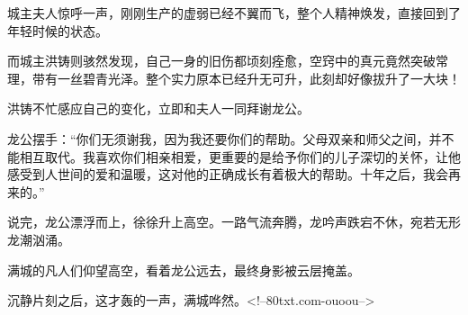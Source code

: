 \begin{this_body}
城主夫人惊呼一声，刚刚生产的虚弱已经不翼而飞，整个人精神焕发，直接回到了年轻时候的状态。

而城主洪铸则骇然发现，自己一身的旧伤都顷刻痊愈，空窍中的真元竟然突破常理，带有一丝碧青光泽。整个实力原本已经升无可升，此刻却好像拔升了一大块！

洪铸不忙感应自己的变化，立即和夫人一同拜谢龙公。

龙公摆手：“你们无须谢我，因为我还要你们的帮助。父母双亲和师父之间，并不能相互取代。我喜欢你们相亲相爱，更重要的是给予你们的儿子深切的关怀，让他感受到人世间的爱和温暖，这对他的正确成长有着极大的帮助。十年之后，我会再来的。”

说完，龙公漂浮而上，徐徐升上高空。一路气流奔腾，龙吟声跌宕不休，宛若无形龙潮汹涌。

满城的凡人们仰望高空，看着龙公远去，最终身影被云层掩盖。

沉静片刻之后，这才轰的一声，满城哗然。<!--80txt.com-ouoou-->

\end{this_body}

